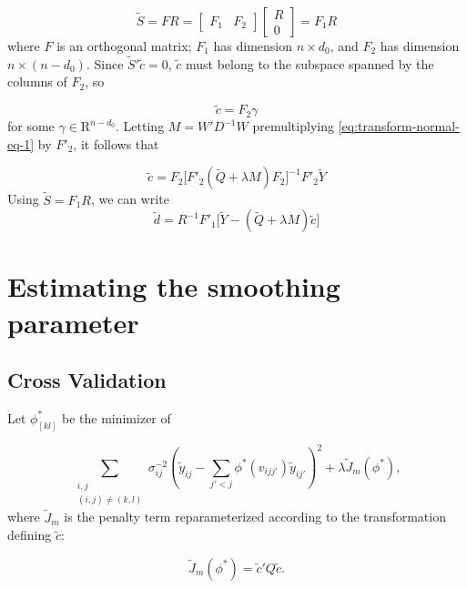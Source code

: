 \documentclass[12pt]{article}
\newcommand{\tildec}{\tilde{c}}
\newcommand{\tildeS}{\tilde{S}}
\newcommand{\tilded}{\tilde{d}}
\newcommand{\tildeY}{\tilde{Y}}
\newcommand{\tildey}{\tilde{y}}
\newcommand{\tildeQ}{\tilde{Q}}
\theoremstyle{definition}
\begin{document}
\begin{equation*}
\tildeS =  F R = \begin{bmatrix} F_1 &  F_2 \end{bmatrix} \begin{bmatrix} R \\  0 \end{bmatrix} = F_1 R
\end{equation*}
\noindent
where $F$ is an orthogonal matrix; $F_1$ has dimension $n \times d_0$,  and $F_2$ has dimension $n \times \left(n-d_0\right)$. Since $\tildeS'\tildec = 0$, $\tildec$ must belong to the subspace spanned by the columns of $F_2$, so 

\[
\tildec = F_2 \gamma
\] 
\noindent
for some $\gamma \in \mathrm{R}^{n-d_0}$. Letting $M = W'D^{-1}W$ premultiplying \ref{eq:transform-normal-eq-1} by $F'_2$, it follows that 

\begin{equation} \label{eq:solve-for-ctilde}
\tildec =  F_2\bigg[ F'_2 \left( \tildeQ + \lambda M \right)F_2 \bigg]^{-1} F'_2 \tildeY
\end{equation}
\bigskip
\noindent
Using $\tildeS = F_1 R$, we can write
\begin{equation} \label{eq:solve-for-dtilde}
\tilded = R^{-1} F'_1 \bigg[ \tildeY - \left( \tildeQ + \lambda M \right) \tildec  \bigg]
\end{equation}

\section{Estimating the smoothing parameter}

\subsection{Cross Validation}

Let $\phi_{\left[kl\right]}^{*}$ be the minimizer of 

\begin{equation}
\sum_{\substack{i,j \\ \left(i,j\right)\neq \left(k,l\right)}}  \sigma^{-2}_{ij}\left( \tildey_{ij} -  \sum_{j'<j}\phi^*\left( v_{ijj'} \right) \tildey_{ij'} \right)^2 + \lambda \tilde{J}_m \left( \phi^* \right),
\end{equation}
\bigskip
where $\tilde{J}_m$ is the penalty term reparameterized according to the transformation defining $\tildec$:

\begin{equation}
\tilde{J}_m\left( \phi^* \right) = \tildec' Q \tildec.
\end{equation}
\end{document}
